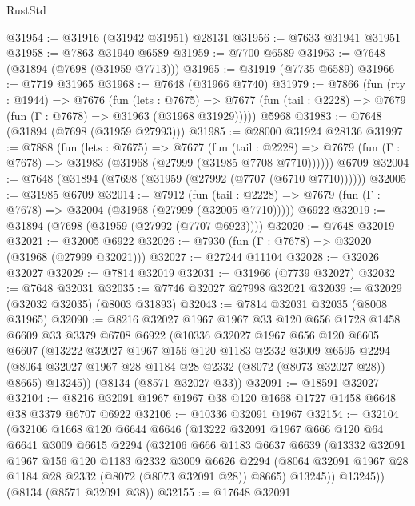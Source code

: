 \begin{lexlean}{RustStd}
\begin{coremodule}
{\begin{coremodule}
{{{{{{{{{{{{{{{{{{{{{{{{{{{{{{{{{{{{{{{{{{{{{{{{{{{{{@31954 := @31916 (@31942 @31951) @28131
@31956 := @7633 @31941 @31951
@31958 := @7863 @31940 @6589
@31959 := @7700 @6589
@31963 := @7648 (@31894 (@7698 (@31959 @7713)))
@31965 := @31919 (@7735 @6589)
@31966 := @7719 @31965
@31968 := @7648 (@31966 @7740)
@31979 := @7866
    (fun (rty : @1944) =>
    @7676
      (fun (lets : @7675) =>
      @7677 (fun (tail : @2228) => @7679 (fun (Γ : @7678) => @31963 (@31968 @31929)))))
    @5968
@31983 := @7648 (@31894 (@7698 (@31959 @27993)))
@31985 := @28000 @31924 @28136
@31997 := @7888
    (fun (lets : @7675) =>
    @7677
      (fun (tail : @2228) =>
      @7679 (fun (Γ : @7678) => @31983 (@31968 (@27999 (@31985 @7708 @7710))))))
    @6709
@32004 := @7648 (@31894 (@7698 (@31959 (@27992 (@7707 (@6710 @7710))))))
@32005 := @31985 @6709
@32014 := @7912
    (fun (tail : @2228) => @7679 (fun (Γ : @7678) => @32004 (@31968 (@27999 (@32005 @7710)))))
    @6922
@32019 := @31894 (@7698 (@31959 (@27992 (@7707 @6923))))
@32020 := @7648 @32019
@32021 := @32005 @6922
@32026 := @7930 (fun (Γ : @7678) => @32020 (@31968 (@27999 @32021)))
@32027 := @27244 @11104
@32028 := @32026 @32027
@32029 := @7814 @32019
@32031 := @31966 (@7739 @32027)
@32032 := @7648 @32031
@32035 := @7746 @32027 @27998 @32021
@32039 := @32029 (@32032 @32035) (@8003 @31893)
@32043 := @7814 @32031 @32035 (@8008 @31965)
@32090 := @8216
    @32027
    @1967
    @1967
    @33
    @120
    @656
    @1728
    @1458
    @6609
    @33
    @3379
    @6708
    @6922
    (@10336
      @32027
      @1967
      @656
      @120
      @6605
      @6607
      (@13222
        @32027
        @1967
        @156
        @120
        @1183
        @2332
        @3009
        @6595
        @2294
        (@8064 @32027 @1967 @28 @1184 @28 @2332 (@8072 (@8073 @32027 @28)) @8665)
        @13245))
    (@8134 (@8571 @32027 @33))
@32091 := @18591 @32027
@32104 := @8216 @32091 @1967 @1967 @38 @120 @1668 @1727 @1458 @6648 @38 @3379 @6707 @6922
@32106 := @10336 @32091 @1967
@32154 := @32104
    (@32106
      @1668
      @120
      @6644
      @6646
      (@13222
        @32091
        @1967
        @666
        @120
        @64
        @6641
        @3009
        @6615
        @2294
        (@32106
          @666
          @1183
          @6637
          @6639
          (@13332
            @32091
            @1967
            @156
            @120
            @1183
            @2332
            @3009
            @6626
            @2294
            (@8064 @32091 @1967 @28 @1184 @28 @2332 (@8072 (@8073 @32091 @28)) @8665)
            @13245))
        @13245))
    (@8134 (@8571 @32091 @38))
@32155 := @17648 @32091
}}}}}}}}}}}}}}}}}}}}}}}}}}}}}}}}}}}}}}}}}}}}}}}}}}}}}
\end{coremodule}}
\end{coremodule}
\end{lexlean}
